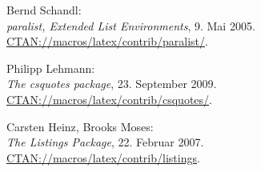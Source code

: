 \documentclass{exercise}
\begin{document}
\begin{thebibliography}{22}
     Bernd Schandl: \\
    \emph{paralist, Extended List Environments}, 9. Mai 2005. \\
    \href{http://mirror.ctan.org/macros/latex/contrib/paralist/}{CTAN://macros/latex/contrib/paralist/}.

     Philipp Lehmann: \\
    \emph{The csquotes package}, 23. September 2009. \\
    \href{http://mirror.ctan.org/macros/latex/contrib/csquotes/}{CTAN://macros/latex/contrib/csquotes/}.

     Carsten Heinz, Brooks Moses: \\
    \emph{The Listings Package}, 22. Februar 2007. \\
    \href{http://mirror.ctan.org/macros/latex/contrib/listings}{CTAN://macros/latex/contrib/listings}.

  \end{thebibliography}
\end{document}
